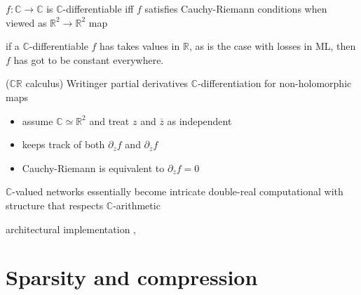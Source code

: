 \documentclass{beamer}
\newcommand{\real}{\mathbb{R}}
\newcommand{\cplx}{\mathbb{C}}
\newcommand{\conj}[1]{\overline{#1}}
\begin{document}
\begin{frame}[t]{\insertsection}

  $f\colon \cplx\to \cplx$ is $\cplx$-differentiable iff $f$ satisfies
  Cauchy-Riemann conditions when viewed as $\real^2 \to \real^2$ map

  if a $\cplx$-differentiable $f$ has takes values in $\real$, as is the
  case with losses in ML, then $f$ has got to be constant everywhere.

  ($\cplx\real$ calculus) Writinger partial derivatives $\cplx$-differentiation for non-holomorphic maps
  \begin{itemize}
    \item assume $\cplx\simeq \real^2$ and treat $z$ and $\conj{z}$ as independent
    \item keeps track of both $
      \partial_z f
    $ and $
      \partial_{\conj{z}} f
    $
    \item Cauchy-Riemann is equivalent to $\partial_{\conj{z}} f = 0$
  \end{itemize}


  $\cplx$-valued networks essentially become intricate double-real computational
  with structure that respects $\cplx$-arithmetic

  architectural implementation \cite{trabelsi_deep_2018}, \cite{arjovsky_unitary_2016}
\end{frame}



\section{Sparsity and compression} %
\label{sec:compression}
\end{document}
